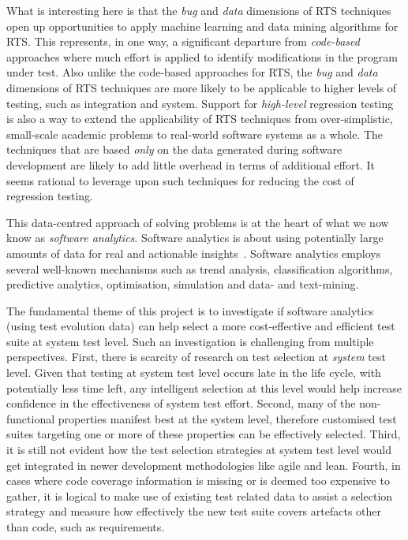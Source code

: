 \documentclass[11pt, oneside]{article}   	%
\begin{document}
What is interesting here is that the \textit{bug} and \textit{data} dimensions of RTS techniques open up opportunities to apply machine learning and data mining algorithms for RTS. This represents, in one way, a significant departure from \textit{code-based} approaches where much effort is applied to identify modifications in the program under test. Also unlike the code-based approaches for RTS, the \textit{bug} and \textit{data} dimensions of RTS techniques are more likely to be applicable to higher levels of testing, such as integration and system. Support for \textit{high-level} regression testing is also a way to extend the applicability of RTS techniques from over-simplistic, small-scale academic problems to real-world software systems as a whole. The techniques that are based \textit{only} on the data generated during software development are likely to add little overhead in terms of additional effort. It seems rational to leverage upon such techniques for reducing the cost of regression testing.

This data-centred approach of solving problems is at the heart of what we now know as \textit{software analytics}. Software analytics is about using potentially large amounts of data for real and actionable insights~\cite{Buse10}. Software analytics employs several well-known mechanisms such as trend analysis, classification algorithms, predictive analytics, optimisation, simulation and data- and text-mining.

The fundamental theme of this project is to investigate if software analytics (using test evolution data) can help select a more cost-effective and efficient test suite at system test level. Such an investigation is challenging from multiple perspectives. First, there is scarcity of research on test selection at \textit{system} test level. Given that testing at system test level occurs late in the life cycle, with potentially less time left, any intelligent selection at this level would help increase confidence in the effectiveness of system test effort. Second, many of the non-functional properties manifest best at the system level, therefore customised test suites targeting one or more of these properties can be effectively selected. Third, it is still not evident how the test selection strategies at system test level would get integrated in newer development methodologies like agile and lean. Fourth, in cases where code coverage information is missing or is deemed too expensive to gather, it is logical to make use of existing test related data to assist a selection strategy and measure how effectively the new test suite covers artefacts other than code, such as requirements. 
\end{document}
